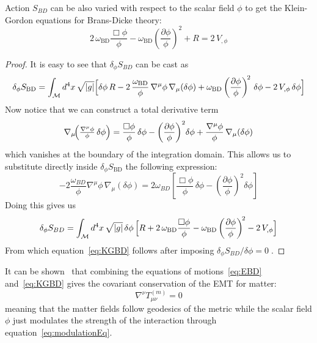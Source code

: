 Action $S_{BD}$ can be also varied with respect to the scalar field $\phi$ to get the Klein-Gordon equations for Brans-Dicke theory:
\begin{equation}\label{eq:KGBD}
    2\,\omega_{\mathrm{BD}}\frac{\Box\phi}{\phi}
    - \omega_{\mathrm{BD}}
      \left(\frac{\partial\phi}{\phi}\right)^{\!2}
    + R = 2\,V_{,\phi}
\end{equation}
\begin{proof}
    It is easy to see that $\delta_\phi S_{BD}$ can be cast as
\begin{equation*}
    \delta_\phi S_{\mathrm{BD}}
      = \int_{\mathcal{M}} d^{4}x\,\sqrt{|g|}
         \Bigl[ \delta\phi\,R
            - 2\,\frac{\omega_{\mathrm{BD}}}{\phi}\,
              \nabla^{\mu}\phi\,\nabla_{\mu}(\delta\phi)
            + \omega_{\mathrm{BD}}
              \left(\frac{\partial\phi}{\phi}\right)^{\!2}\,\delta\phi
            - 2\,V_{,\phi}\,\delta\phi\Bigr]
\end{equation*}
Now notice that we can construct a total derivative term
\begin{equation*}
        \nabla_\mu\!\Bigl(\tfrac{\nabla^{\mu}\phi}{\phi}\,\delta\phi\Bigr)
           = \frac{\Box\phi}{\phi}\,\delta\phi
             - \left(\frac{\partial\phi}{\phi}\right)^{2}\!\delta\phi
             + \frac{\nabla^{\mu}\phi}{\phi}\,\nabla_{\mu}(\delta\phi)
\end{equation*}
which vanishes at the boundary of the integration domain. This allows us to substitute directly inside $\delta_\phi S_{\mathrm{BD}}$ the following expression:
\begin{equation*}
    -2 \frac{\omega_{BD}}{\phi}\nabla^{\mu}\phi\,\nabla_{\mu}(\delta\phi) = 2 \omega_{BD} \left[\frac{\Box\phi}{\phi}\,\delta\phi
    - \left(\frac{\partial\phi}{\phi}\right)^{2}\!\delta\phi\right]
\end{equation*}
Doing this gives us 
\begin{equation*}
    \delta_\phi S_{BD}
      = \int_{\mathcal{M}} d^{4}x\,\sqrt{|g|}\,\delta\phi\,
         \Bigl[
            R
            + 2\,\omega_{\mathrm{BD}}\frac{\Box\phi}{\phi}
            - \omega_{\mathrm{BD}}
              \left(\frac{\partial\phi}{\phi}\right)^{\!2}
            - 2\,V_{,\phi}
         \Bigr]
\end{equation*}
From which equation~\eqref{eq:KGBD} follows after imposing $\delta_\phi S_{BD}/\delta \phi = 0\;$.
\end{proof}
    
It can be shown~\cite{Quiros:2019ktw} that combining the equations of motions~\eqref{eq:EBD} and~\eqref{eq:KGBD} gives the covariant conservation
of the EMT for matter:
\begin{equation}
  \nabla^{\nu}T_{\mu\nu}^{(m)}= 0
\end{equation} 
meaning that the matter fields follow geodesics of the metric while the scalar field $\phi$ just modulates the strength of the interaction through equation~\eqref{eq:modulationEq}.
